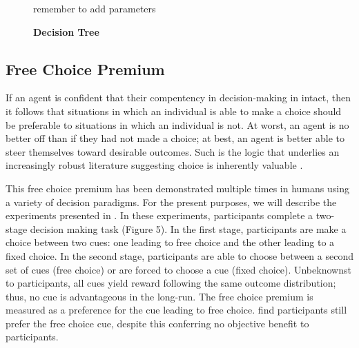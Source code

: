 \documentclass[11pt]{article} %
\begin{document}
\begin{figure}
  \centerline{%
  }
  \caption{\textbf{Decision Tree}}
  \par remember to add parameters
\end{figure}

\subsection{Free Choice Premium}

If an agent is confident that their compentency in decision-making in intact, then it follows that situations in which an individual is able to make a choice should be preferable to situations in which an individual is not. At worst, an agent is no better off than if they had not made a choice; at best, an agent is better able to steer themselves toward desirable outcomes. Such is the logic that underlies an increasingly robust literature suggesting choice is inherently valuable \citep{Leotti2010}.

This free choice premium has been demonstrated multiple times in humans \citep{Suzuki1997, Leotti2011, Leotti2014, Cockburn2014} using a variety of decision paradigms. For the present purposes, we will describe the experiments presented in \citep{Leotti2011, Leotti2014}. In these experiments, participants complete a two-stage decision making task (Figure 5). In the first stage, participants are make a choice between two cues: one leading to free choice and the other leading to a fixed choice. In the second stage, participants are able to choose between a second set of cues (free choice) or are forced to choose a cue (fixed choice). Unbeknownst to participants, all cues yield reward following the same outcome distribution; thus, no cue is advantageous in the long-run. The free choice premium is measured as a preference for the cue leading to free choice. \cite{Leotti2011, Leotti2014} find participants still prefer the free choice cue, despite this conferring no objective benefit to participants.
\end{document}
